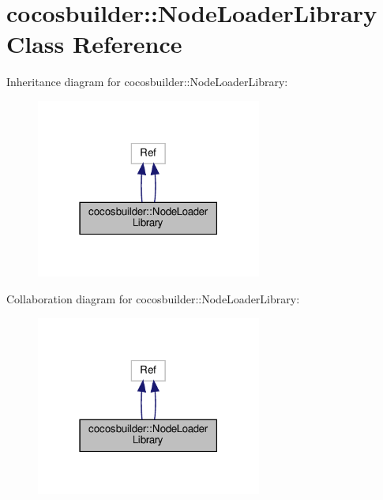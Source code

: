 \hypertarget{classcocosbuilder_1_1NodeLoaderLibrary}{}\section{cocosbuilder\+:\+:Node\+Loader\+Library Class Reference}
\label{classcocosbuilder_1_1NodeLoaderLibrary}


Inheritance diagram for cocosbuilder\+:\+:Node\+Loader\+Library\+:
\nopagebreak
\begin{figure}[H]
\begin{center}
\leavevmode
\includegraphics[width=210pt]{classcocosbuilder_1_1NodeLoaderLibrary__inherit__graph}
\end{center}
\end{figure}


Collaboration diagram for cocosbuilder\+:\+:Node\+Loader\+Library\+:
\nopagebreak
\begin{figure}[H]
\begin{center}
\leavevmode
\includegraphics[width=210pt]{classcocosbuilder_1_1NodeLoaderLibrary__coll__graph}
\end{center}
\end{figure}
